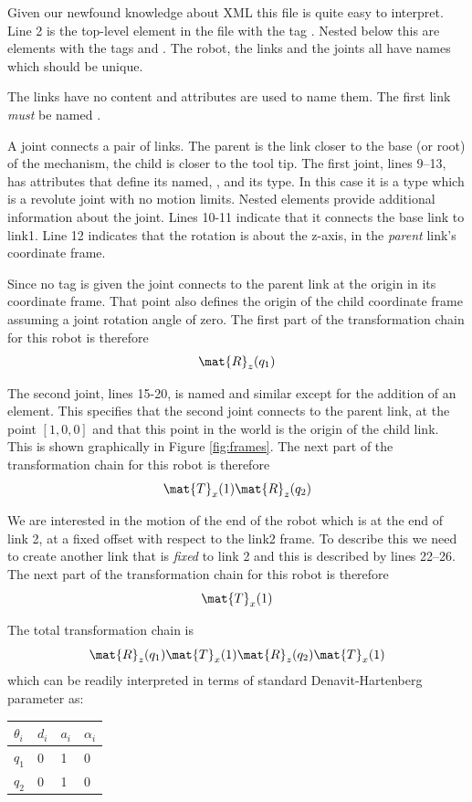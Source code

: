 \documentclass[9pt,fleqn,a4paper]{article}
\begin{document}
Given our newfound knowledge about XML this file is quite easy to interpret.
Line 2 is the top-level element in the file with the tag .
Nested below this are elements with the tags  and .
The robot, the links and the joints all have names which should be unique.

The links have no content and attributes are used to name them.  The first link \emph{must} be named .

A joint connects a pair of links.  The parent is the link closer to the base (or root) of the mechanism, the child is closer to the tool tip.
The first joint, lines 9--13, has attributes that define its named, , and its type.  In this case it is a  type which is a revolute joint with no motion limits.
Nested elements provide additional information about the joint.
Lines 10-11 indicate that it connects the base link to link1.
Line 12 indicates that the rotation is about the z-axis, in the \emph{parent} link's coordinate frame.

Since no  tag is given the joint connects to the parent link at the origin in its coordinate frame.  That point also defines the origin of the child coordinate frame assuming a joint rotation angle of zero.
The first part of the transformation chain for this robot is therefore
\[
\mat{R}_z(q_1)
\]

The second joint, lines 15-20, is named  and similar except for the addition of an  element.  This specifies that the second joint connects to the parent link,  at the point $[1,0,0]$ and that this point in the world is the origin of the child link.
This is shown graphically in Figure \ref{fig:frames}.
The next part of the transformation chain for this robot is therefore
\[
\mat{T}_x(1) \mat{R}_z(q_2)
\]

We are interested in the motion of the end of the robot which is at the end of link 2, at a fixed offset with respect to the link2 frame.
To describe this we need to create another link that is \textit{fixed} to link 2 and this is described by lines 22--26.
The next part of the transformation chain for this robot is therefore
\[
\mat{T}_x(1) 
\]

The total transformation chain is
\[
\mat{R}_z(q_1) \mat{T}_x(1) \mat{R}_z(q_2) \mat{T}_x(1)
\]
which can be readily interpreted in terms of standard Denavit-Hartenberg parameter as:

\begin{center}
\begin{tabular}{|l|l|l|l|} \hline
$\theta_i$ & $d_i$ & $a_i$ & $\alpha_i$ \\ \hline\hline
$q_1$ & 0 & 1 & 0 \\
$q_2$ & 0 & 1 & 0 \\ \hline
\end{tabular}
\end{center}
\end{document}
